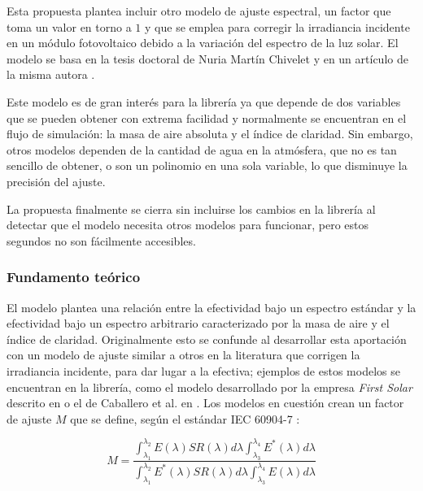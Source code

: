 Esta propuesta plantea incluir otro \gls{modelo} de \gls{ajuste espectral}, un factor que toma un valor en torno a $1$ y que se emplea para corregir la \gls{irradiancia} incidente en un \gls{módulo} fotovoltaico debido a la variación del espectro de la luz solar. El modelo se basa en la tesis doctoral de Nuria Martín Chivelet \cite{Martín_Chivelet_1999} y en un artículo de la misma autora \cite{Martín_Ruiz_1999}.

Este modelo es de gran interés para la librería ya que depende de dos variables que se pueden obtener con extrema facilidad y normalmente se encuentran en el flujo de simulación: la masa de aire absoluta y el \gls{índice de claridad}. Sin embargo, otros modelos dependen de la cantidad de agua en la atmósfera, que no es tan sencillo de obtener, o son un polinomio en una sola variable, lo que disminuye la precisión del ajuste.

La propuesta finalmente se cierra sin incluirse los cambios en la librería al detectar que el modelo necesita otros modelos para funcionar, pero estos segundos no son fácilmente accesibles.

\subsubsection{Fundamento teórico}

El modelo \cite{Martín_Ruiz_1999} plantea una relación entre la efectividad bajo un \gls{espectro estándar} y la efectividad bajo un \gls{espectro arbitrario} caracterizado por la masa de aire y el índice de claridad. Originalmente esto se confunde al desarrollar esta aportación con un modelo de ajuste similar a otros en la literatura que corrigen la irradiancia incidente, para dar lugar a la efectiva; ejemplos de estos modelos se encuentran en la librería, como el modelo desarrollado por la empresa \textit{First Solar} descrito en \cite{Lee_Panchula_2016} o el de Caballero et al. en \cite{Caballero_Fernández_Theristis_Almonacid_Nofuentes_2018}. Los modelos en cuestión crean un factor de ajuste $M$ que se define, según el \gls{estándar} IEC 60904-7 \cite[Eq. (2)]{Caballero_Fernández_Theristis_Almonacid_Nofuentes_2018}:

\begin{equation} \label{eq:ajuste_espectral}
    M = \frac
    {\int_{\lambda_1}^{\lambda_2} E(\lambda) SR(\lambda) d\lambda \int_{\lambda_3}^{\lambda_4} E^*(\lambda) d\lambda}
    {\int_{\lambda_1}^{\lambda_2} E^*(\lambda) SR(\lambda) d\lambda \int_{\lambda_3}^{\lambda_4} E(\lambda) d\lambda}
\end{equation}

